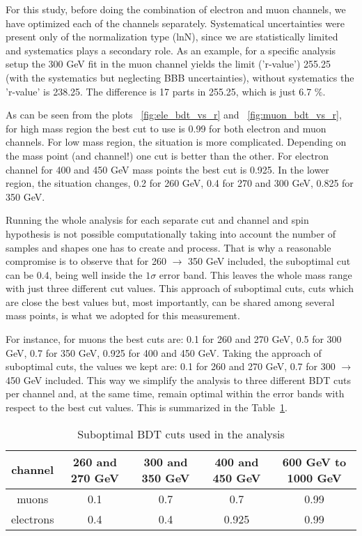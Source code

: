 For this study, before doing the combination of electron and muon channels, we have optimized each of the channels separately. Systematical uncertainties were present only of the normalization type (lnN), since we are statistically limited and systematics plays a secondary role. %
As an example, for a specific analysis setup the 300 GeV fit in the muon channel yields the limit ('r-value') 255.25 (with the systematics but neglecting BBB uncertainties), without systematics the 'r-value' is 238.25. The difference is 17 parts in 255.25, which is just 6.7 $\%$.

As can be seen from the plots ~\ref{fig:ele_bdt_vs_r} and ~\ref{fig:muon_bdt_vs_r}, for high mass region the best cut to use is 0.99 for both electron and muon channels. For low mass region, the situation is more complicated. Depending on the mass point (and channel!) one cut is better than the other. For electron channel for 400 and 450 GeV mass points the best cut is 0.925. In the lower region, the situation changes, 0.2 for 260 GeV, 0.4 for 270 and 300 GeV, 0.825 for 350 GeV. 

Running the whole analysis for each separate cut and channel and spin hypothesis is not possible computationally taking into account the number of samples and shapes one has to create and process. That is why a reasonable compromise is to observe that for 260 $\to$ 350 GeV included, the suboptimal cut can be 0.4, being well inside the $1\sigma$ error band. This leaves the whole mass range with just three different cut values. This approach of suboptimal cuts, cuts which are close the best values but, most importantly, can be shared among several mass points, is what we adopted for this measurement. 

For instance, for muons the best cuts are: 0.1 for 260 and 270 GeV, 0.5 for 300 GeV, 0.7 for 350 GeV, 0.925 for 400 and 450 GeV. Taking the approach of suboptimal cuts, the values we kept are: 0.1 for 260 and 270 GeV, 0.7 for 300 $\to$ 450 GeV included. This way we simplify the analysis to three different BDT cuts per channel and, at the same time, remain optimal within the error bands with respect to the best cut values. This is summarized in the Table~\ref{suboptCut}.

\begin{table}
\begin{center} 
  \caption{Suboptimal BDT cuts used in the analysis}
 \begin{tabular}{ |c|c|c|c|c| } \hline%
   channel & 260 and 270 GeV & 300 and 350 GeV & 400 and 450 GeV & 600 GeV to 1000 GeV \\ \hline
   muons & 0.1 & 0.7 & 0.7 & 0.99 \\ %
   electrons & 0.4 & 0.4 & 0.925 & 0.99\\ \hline%
  \end{tabular}
  \label{suboptCut}
\end{center}   
\end{table}









